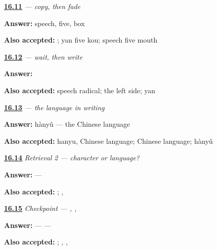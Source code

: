 \noindent\begin{minipage}[t]{\linewidth}
\raggedright
\hyperlink{review-ZH-W16-yu-guided-check}{\textbf{16.11}} \emph{ — copy, then fade}\par
\small \textbf{Answer:} speech, five, box\par
\footnotesize \textbf{Also accepted:}   ; yan five kou; speech five mouth
\end{minipage}\par\medskip

\noindent\begin{minipage}[t]{\linewidth}
\raggedright
\hyperlink{review-ZH-W16-yu-delayed-recall}{\textbf{16.12}} \emph{ — wait, then write}\par
\small \textbf{Answer:} \par
\footnotesize \textbf{Also accepted:} speech radical; the left side; yan
\end{minipage}\par\medskip

\noindent\begin{minipage}[t]{\linewidth}
\raggedright
\hyperlink{review-ZH-C16-hanyu-read}{\textbf{16.13}} \emph{ — the language in writing}\par
\small \textbf{Answer:} hànyǔ — the Chinese language\par
\footnotesize \textbf{Also accepted:} hanyu, Chinese language; Chinese language; hànyǔ
\end{minipage}\par\medskip

\noindent\begin{minipage}[t]{\linewidth}
\raggedright
\hyperlink{review-ZH-R16-identity-2-contrast}{\textbf{16.14}} \emph{Retrieval 2 — character or language?}\par
\small \textbf{Answer:}  — \par
\footnotesize \textbf{Also accepted:}  ; , 
\end{minipage}\par\medskip

\noindent\begin{minipage}[t]{\linewidth}
\raggedright
\hyperlink{review-ZH-C16-practice-pass}{\textbf{16.15}} \emph{Checkpoint — , , }\par
\small \textbf{Answer:}  —  — \par
\footnotesize \textbf{Also accepted:}   ; , , 
\end{minipage}\par\medskip

